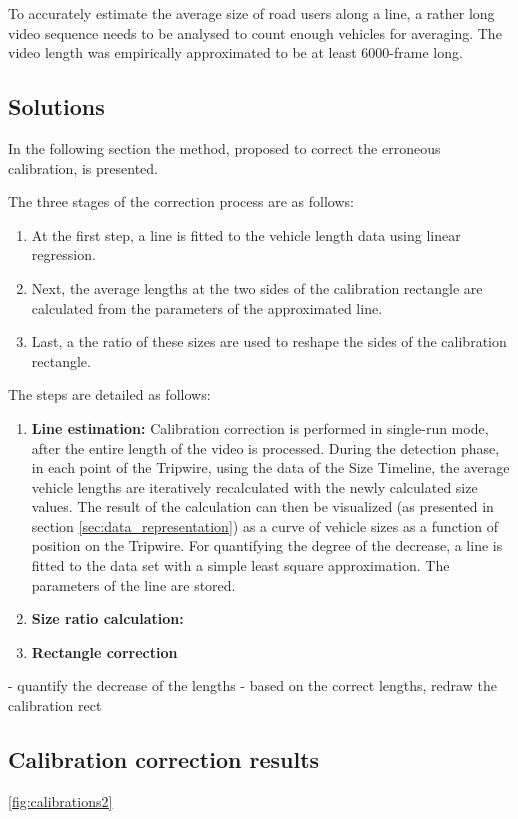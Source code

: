 To accurately estimate the average size of road users along a line, a rather long video sequence needs to be analysed to count enough vehicles for averaging.
The video length was empirically approximated to be at least 6000-frame long.

\subsection{Solutions}
In the following section the method, proposed to correct the erroneous calibration, is presented.

The three stages of the correction process are as follows:
\begin{enumerate}
\item At the first step, a line is fitted to the vehicle length data using linear regression.
\item Next, the average lengths at the two sides of the calibration rectangle are calculated from the parameters of the approximated line.
\item Last, a the ratio of these sizes are used to reshape the sides of the calibration rectangle.
\end{enumerate}

The steps are detailed as follows:
\begin{enumerate}
	\item  \textbf{Line estimation:} 
	Calibration correction is performed in single-run mode, after the entire length of the video is processed.
	During the detection phase, in each point of the Tripwire, using the data of the Size Timeline, the average vehicle lengths are iteratively recalculated with the newly calculated size values.
	The result of the calculation can then be visualized (as presented in section \ref{sec:data_representation}) as a curve of vehicle sizes as a function of position on the Tripwire.
	For quantifying the degree of the decrease, a line is fitted to the data set with a simple least square approximation.
	The parameters of the line are stored.
	
	\item  \textbf{Size ratio calculation:}
	\item  \textbf{Rectangle correction}
\end{enumerate}
- quantify the decrease of the lengths
- based on the correct lengths, redraw the calibration rect

\subsection{Calibration correction results}
\ref{fig:calibrations2}

